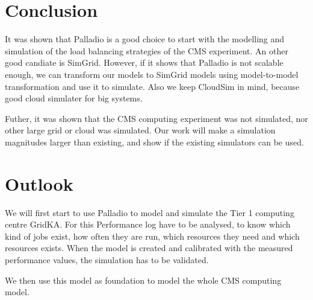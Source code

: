 \begin{center}
\label{compare}
\end{center}

\chapter{Conclusion}

It was shown that Palladio is a good choice to start with the modelling and simulation of the load balancing strategies of the CMS experiment. An other good candiate is SimGrid. However, if it shows that Palladio is not scalable enough, we can transform our models to SimGrid models using model-to-model transformation and use it to simulate. Also we keep CloudSim in mind, because good cloud simulater for big systems. 

Futher, it was shown that the CMS computing experiment was not simulated, nor other large grid or cloud was simulated. Our work will make a simulation magnitudes larger than existing,  and show if the existing simulators can be used.

\chapter{Outlook}
We will first start to use Palladio to model and simulate the Tier 1 computing centre GridKA. 
For this Performance log have to be analysed, to know which kind of jobs exist, how often they are run, which resources they need and which resources exists.
When the model is created and calibrated with the measured performance values, the simulation has to be validated.

We then use this model as foundation to model the whole CMS computing model.

